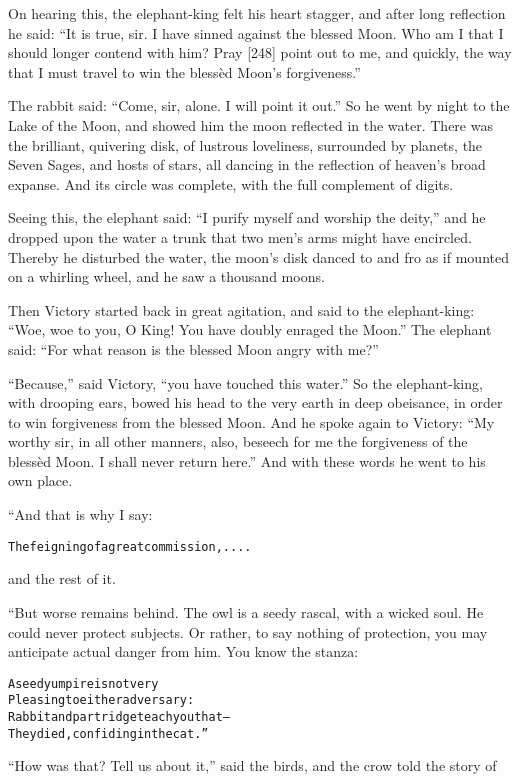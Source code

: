 \documentclass{article}
\renewenvironment{verbatim}{\begin{alltt}\normalfont\begin{centering}}{\end{centering}\end{alltt}}
\begin{document}
On hearing this, the elephant-king felt his heart stagger, and
after long reflection he said:
``It is true, sir. I have sinned against the blessed Moon. Who am I that I should longer contend with him? Pray [248] point out to me, and quickly, the way that I must travel to win the blessèd Moon's forgiveness.''

The rabbit said: ``Come, sir, alone. I will point it out.'' So he
went by night to the Lake of the Moon, and showed him the moon
reflected in the water. There was the brilliant, quivering disk, of
lustrous loveliness, surrounded by planets, the Seven Sages, and
hosts of stars, all dancing in the reflection of heaven's broad
expanse. And its circle was complete, with the full complement of
digits.

Seeing this, the elephant said:
``I purify myself and worship the deity,'' and he dropped upon the
water a trunk that two men's arms might have encircled. Thereby he
disturbed the water, the moon's disk danced to and fro as if
mounted on a whirling wheel, and he saw a thousand moons.

Then Victory started back in great agitation, and said to the
elephant-king:
``Woe, woe to you, O King! You have doubly enraged the Moon.'' The
elephant said:
``For what reason is the blessed Moon angry with me?''

``Because,'' said Victory, ``you have touched this water.'' So the
elephant-king, with drooping ears, bowed his head to the very earth
in deep obeisance, in order to win forgiveness from the blessed
Moon. And he spoke again to Victory:
``My worthy sir, in all other manners, also, beseech for me the forgiveness of the blessèd Moon. I shall never return here.''
And with these words he went to his own place.

“And that is why I say:

\begin{verbatim}
The feigning of a great commission,....
\end{verbatim}
and the rest of it.

“But worse remains behind. The owl is a seedy rascal, with a wicked
soul. He could never protect subjects. Or rather, to say nothing of
protection, you may anticipate actual danger from him. You know the
stanza:

\begin{verbatim}
A seedy umpire is not very
Pleasing to either adversary:
Rabbit and partridge teach you that--
They died, confiding in the cat.”
\end{verbatim}
``How was that? Tell us about it,'' said the birds, and the crow
told the story of
\end{document}
